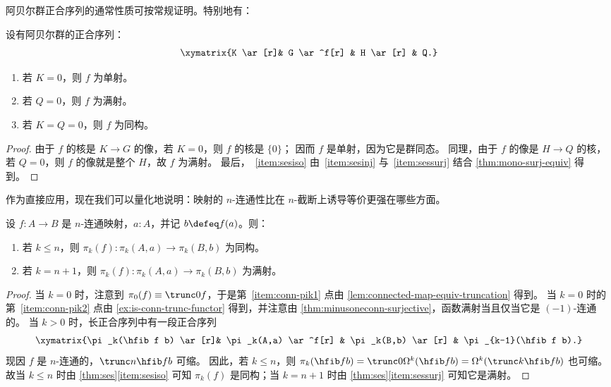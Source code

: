 阿贝尔群正合序列的通常性质可按常规证明。特别地有：
\begin{lem}\label{thm:ses}
  设有阿贝尔群的正合序列：
  \[\xymatrix{K \ar[r]& G \ar^f[r] & H \ar[r] & Q.}\]
  \begin{enumerate}
  \item 若 $K=0$，则 $f$ 为单射。\label{item:sesinj}
  \item 若 $Q=0$，则 $f$ 为满射。\label{item:sessurj}
  \item 若 $K=Q=0$，则 $f$ 为同构。\label{item:sesiso}
  \end{enumerate}
\end{lem}
\begin{proof}
  由于 $f$ 的核是 $K\to G$ 的像，若 $K=0$，则 $f$ 的核是 $\{0\}$；
  因而 $f$ 是单射，因为它是群同态。
  同理，由于 $f$ 的像是 $H\to Q$ 的核，若 $Q=0$，则 $f$ 的像就是整个 $H$，故 $f$ 为满射。
  最后，~\ref{item:sesiso} 由~\ref{item:sesinj} 与~\ref{item:sessurj} 结合 \cref{thm:mono-surj-equiv} 得到。
\end{proof}

作为直接应用，现在我们可以量化地说明：映射的 $n$-连通性比在 $n$-截断上诱导等价更强在哪些方面。

\begin{cor}\label{thm:conn-pik}
  设 $f:A\to B$ 是 $n$-连通映射，$a:A$，并记 $b\defeq f(a)$。则：
  \begin{enumerate}
  \item 若 $k\le n$，则 $\pi_k(f):\pi_k(A,a) \to \pi_k(B,b)$ 为同构。\label{item:conn-pik1}
  \item 若 $k=n+1$，则 $\pi_k(f):\pi_k(A,a) \to \pi_k(B,b)$ 为满射。\label{item:conn-pik2}
  \end{enumerate}
\end{cor}
\begin{proof}
  当 $k=0$ 时，注意到 $\pi_0(f)\equiv\trunc 0f$，于是第~\ref{item:conn-pik1} 点由 \cref{lem:connected-map-equiv-truncation} 得到。
  当 $k=0$ 时的第~\ref{item:conn-pik2} 点由 \cref{ex:is-conn-trunc-functor} 得到，并注意由 \cref{thm:minusoneconn-surjective}，函数满射当且仅当它是 $(-1)$-连通的。
  当 $k>0$ 时，长正合序列中有一段正合序列
  \[\xymatrix{\pi_k(\hfib f b) \ar[r]& \pi_k(A,a) \ar^f[r] & \pi_k(B,b) \ar[r] & \pi_{k-1}(\hfib f b).}\]
  现因 $f$ 是 $n$-连通的，$\trunc n{\hfib f b}$ 可缩。
  因此，若 $k\le n$，则 $\pi_k(\hfib f b) = \trunc0{\Omega^k(\hfib f b)} = \Omega^k(\trunc k{\hfib f b})$ 也可缩。
  故当 $k\le n$ 时由 \cref{thm:ses}\ref{item:sesiso} 可知 $\pi_k(f)$ 是同构；当 $k=n+1$ 时由 \cref{thm:ses}\ref{item:sessurj} 可知它是满射。
\end{proof}

